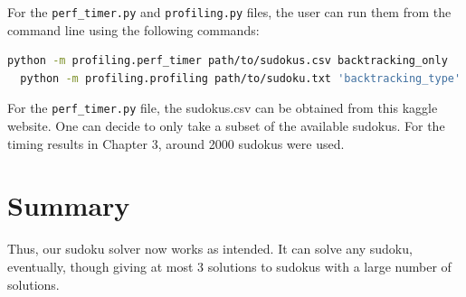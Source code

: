 \documentclass[12pt]{report} %
\begin{document}
For the \texttt{perf\_timer.py} and \texttt{profiling.py} files, the user can run them from the command line using the following commands:

\begin{lstlisting}[language=bash, caption={How to run the profiling and timing files}]
  python -m profiling.perf_timer path/to/sudokus.csv backtracking_only
  python -m profiling.profiling path/to/sudoku.txt 'backtracking_type' backtracking_only
\end{lstlisting}

For the \texttt{perf\_timer.py} file, the sudokus.csv can be obtained from this kaggle website\cite{kaggle_sudoku_dataset}. One can decide to only take a subset of the available sudokus. For the timing results in Chapter 3, around 2000 sudokus were used.


\chapter{Summary}

Thus, our sudoku solver now works as intended. It can solve any sudoku, eventually, though giving at most 3 solutions to sudokus with a large number of solutions.



\end{document}
